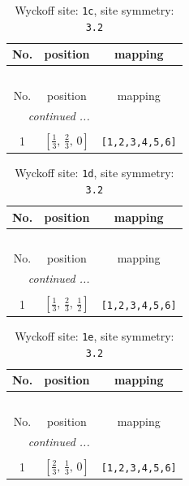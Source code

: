 \documentclass[fleqn,8pt]{jsarticle}
\begin{document}
\begin{longtable}{ccc}
\caption{Wyckoff site: {\tt 1c}, site symmetry: {\tt 3.2}}
 \\
 \hline \hline
No. & position & mapping \\ \hline \endfirsthead

\multicolumn{2}{l}{\tablename\ \thetable{}} \\
 \hline \hline
No. & position & mapping \\ \hline \endhead

 \hline \hline
\multicolumn{2}{r}{\footnotesize\it continued ...} \\ \endfoot

 \hline \hline
\multicolumn{2}{r}{} \\ \endlastfoot

1 & $\left[ \frac{1}{3},\, \frac{2}{3},\, 0 \right]$ & {\tt [1,2,3,4,5,6]} \\
\end{longtable}
\renewcommand{\arraystretch}{1.2}
\begin{longtable}{ccc}
\caption{Wyckoff site: {\tt 1d}, site symmetry: {\tt 3.2}}
 \\
 \hline \hline
No. & position & mapping \\ \hline \endfirsthead

\multicolumn{2}{l}{\tablename\ \thetable{}} \\
 \hline \hline
No. & position & mapping \\ \hline \endhead

 \hline \hline
\multicolumn{2}{r}{\footnotesize\it continued ...} \\ \endfoot

 \hline \hline
\multicolumn{2}{r}{} \\ \endlastfoot

1 & $\left[ \frac{1}{3},\, \frac{2}{3},\, \frac{1}{2} \right]$ & {\tt [1,2,3,4,5,6]} \\
\end{longtable}
\renewcommand{\arraystretch}{1.2}
\begin{longtable}{ccc}
\caption{Wyckoff site: {\tt 1e}, site symmetry: {\tt 3.2}}
 \\
 \hline \hline
No. & position & mapping \\ \hline \endfirsthead

\multicolumn{2}{l}{\tablename\ \thetable{}} \\
 \hline \hline
No. & position & mapping \\ \hline \endhead

 \hline \hline
\multicolumn{2}{r}{\footnotesize\it continued ...} \\ \endfoot

 \hline \hline
\multicolumn{2}{r}{} \\ \endlastfoot

1 & $\left[ \frac{2}{3},\, \frac{1}{3},\, 0 \right]$ & {\tt [1,2,3,4,5,6]} \\
\end{longtable}
\end{document}
